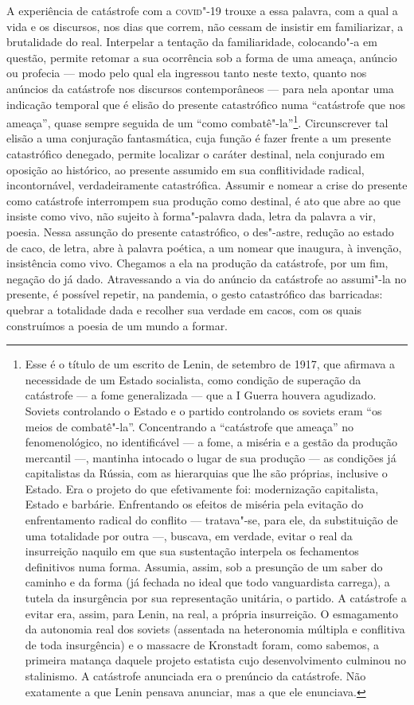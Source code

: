A experiência de catástrofe com a \textsc{covid}"-19 trouxe a essa palavra, com a
qual a vida e os discursos, nos dias que correm, não cessam de insistir
em familiarizar, a brutalidade do real. Interpelar a tentação da
familiaridade, colocando"-a em questão, permite retomar a sua ocorrência
sob a forma de uma ameaça, anúncio ou profecia --- modo pelo qual ela
ingressou tanto neste texto, quanto nos anúncios da catástrofe nos
discursos contemporâneos --- para nela apontar uma indicação temporal
que é elisão do presente catastrófico numa ``catástrofe que nos
ameaça'', quase sempre seguida de um ``como combatê"-la''\footnote{Esse é
  o título de um escrito de Lenin, de setembro de 1917, que afirmava a
  necessidade de um Estado socialista, como condição de superação da
  catástrofe --- a fome generalizada --- que a I Guerra houvera agudizado.
  Soviets controlando o Estado e o partido controlando os soviets eram
  ``os meios de combatê"-la''. Concentrando a ``catástrofe que ameaça''
  no fenomenológico, no identificável --- a fome, a miséria e a gestão da
  produção mercantil ---, mantinha intocado o lugar de sua produção --- as
  condições já capitalistas da Rússia, com as hierarquias que lhe são
  próprias, inclusive o Estado. Era o projeto do que efetivamente foi:
  modernização capitalista, Estado e barbárie. Enfrentando os efeitos de
  miséria pela evitação do enfrentamento radical do conflito ---
  tratava"-se, para ele, da substituição de uma totalidade por outra ---,
  buscava, em verdade, evitar o real da insurreição naquilo em que sua
  sustentação interpela os fechamentos definitivos numa forma. Assumia,
  assim, sob a presunção de um saber do caminho e da forma (já fechada
  no ideal que todo vanguardista carrega), a tutela da insurgência por
  sua representação unitária, o partido. A catástrofe a evitar era,
  assim, para Lenin, na real, a própria insurreição. O esmagamento da
  autonomia real dos soviets (assentada na heteronomia múltipla e
  conflitiva de toda insurgência) e o massacre de Kronstadt foram, como
  sabemos, a primeira matança daquele projeto estatista cujo
  desenvolvimento culminou no stalinismo. A catástrofe anunciada era o
  prenúncio da catástrofe. Não exatamente a que Lenin pensava anunciar,
  mas a que ele enunciava.}. Circunscrever tal elisão a uma conjuração
fantasmática, cuja função é fazer frente a um presente catastrófico
denegado, permite localizar o caráter destinal, nela conjurado em
oposição ao histórico, ao presente assumido em sua conflitividade
radical, incontornável, verdadeiramente catastrófica. Assumir e nomear a
crise do presente como catástrofe interrompem sua produção como
destinal, é ato que abre ao que insiste como vivo, não sujeito à
forma"-palavra dada, letra da palavra a vir, poesia. Nessa assunção do
presente catastrófico, o des"-astre, redução ao estado de caco, de letra,
abre à palavra poética, a um nomear que inaugura, à invenção,
insistência como vivo. Chegamos a ela na produção da catástrofe, por um
fim, negação do já dado. Atravessando a via do anúncio da catástrofe ao
assumi"-la no presente, é possível repetir, na pandemia, o gesto
catastrófico das barricadas: quebrar a totalidade dada e recolher sua
verdade em cacos, com os quais construímos a poesia de um mundo a
formar.

